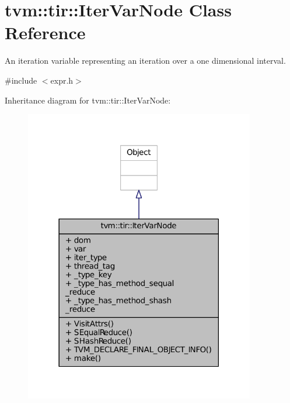 \hypertarget{classtvm_1_1tir_1_1IterVarNode}{}\section{tvm\+:\+:tir\+:\+:Iter\+Var\+Node Class Reference}
\label{classtvm_1_1tir_1_1IterVarNode}


An iteration variable representing an iteration over a one dimensional interval.  




{\ttfamily \#include $<$expr.\+h$>$}



Inheritance diagram for tvm\+:\+:tir\+:\+:Iter\+Var\+Node\+:
\nopagebreak
\begin{figure}[H]
\begin{center}
\leavevmode
\includegraphics[width=285pt]{classtvm_1_1tir_1_1IterVarNode__inherit__graph}
\end{center}
\end{figure}


